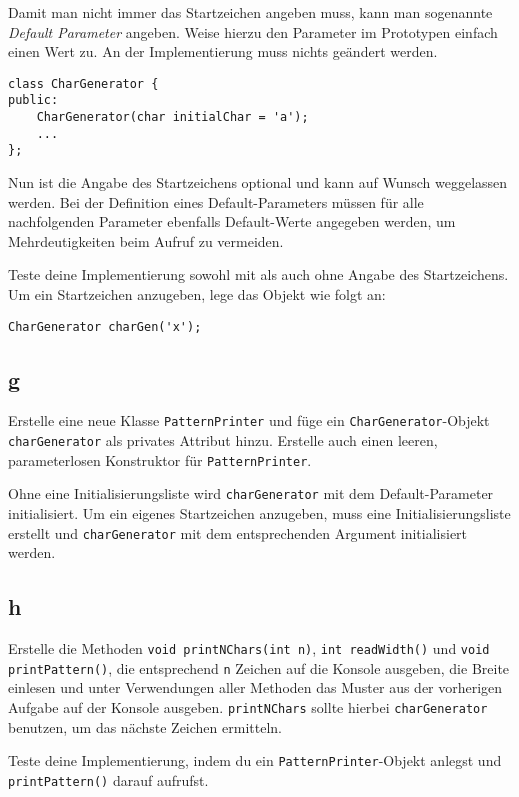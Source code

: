 Damit man nicht immer das Startzeichen angeben muss, kann man sogenannte \emph{Default Parameter} angeben.
Weise hierzu den Parameter im Prototypen einfach einen Wert zu.
An der Implementierung muss nichts geändert werden.
\begin{lstlisting}
class CharGenerator {
public:
	CharGenerator(char initialChar = 'a');
	...
};
\end{lstlisting}

Nun ist die Angabe des Startzeichens optional und kann auf Wunsch weggelassen werden.
Bei der Definition eines Default-Parameters müssen für alle nachfolgenden Parameter ebenfalls Default-Werte angegeben werden, um Mehrdeutigkeiten beim Aufruf zu vermeiden.

Teste deine Implementierung sowohl mit als auch ohne Angabe des Startzeichens.
Um ein Startzeichen anzugeben, lege das Objekt wie folgt an:
\begin{lstlisting}
CharGenerator charGen('x');
\end{lstlisting}

\subsection{g}
Erstelle eine neue Klasse \texttt{PatternPrinter} und füge ein \texttt{CharGenerator}-Objekt \texttt{charGenerator} als privates Attribut hinzu.
Erstelle auch einen leeren, parameterlosen Konstruktor für \texttt{PatternPrinter}.

Ohne eine Initialisierungsliste wird \texttt{charGenerator} mit dem Default-Parameter initialisiert.
Um ein eigenes Startzeichen anzugeben, muss eine Initialisierungsliste erstellt und \texttt{charGenerator} mit dem entsprechenden Argument initialisiert werden.

\subsection{h}
Erstelle die Methoden \texttt{void printNChars(int n)}, \texttt{int readWidth()} und \texttt{void printPattern()}, die entsprechend \texttt{n} Zeichen auf die Konsole ausgeben, die Breite einlesen und unter Verwendungen aller Methoden das Muster aus der vorherigen Aufgabe auf der Konsole ausgeben.
\texttt{printNChars} sollte hierbei \texttt{charGenerator} benutzen, um das nächste Zeichen ermitteln.

Teste deine Implementierung, indem du ein \texttt{PatternPrinter}-Objekt anlegst und \texttt{printPattern()} darauf aufrufst.



